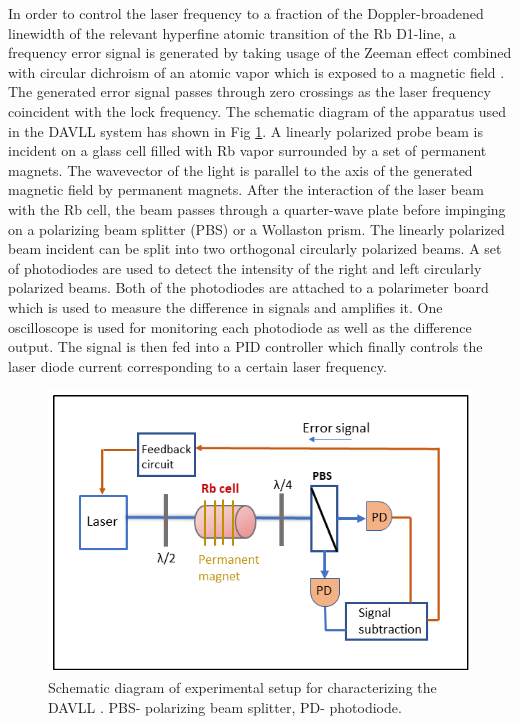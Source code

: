 In order to control the laser frequency to a fraction of the Doppler-broadened linewidth of the relevant hyperfine atomic transition of the Rb D1-line, a frequency error signal is generated by taking usage of the Zeeman effect combined with circular dichroism of an atomic vapor which is exposed to a magnetic field \cite{doi:10.1063/1.3568824}. The generated error signal passes through zero crossings as the laser frequency coincident with the lock frequency. The schematic diagram of the apparatus used in  the DAVLL system has shown in Fig \ref{fig:DAVLL}. A linearly polarized probe beam is incident on a glass cell filled with Rb vapor surrounded by a set of permanent magnets. The wavevector of the light is parallel to the axis of the generated magnetic field by permanent magnets. After the interaction of the laser beam with the Rb cell, the beam passes through a quarter-wave plate before impinging on a polarizing beam splitter (PBS) or a Wollaston prism. The linearly polarized beam incident can be split into two orthogonal circularly polarized beams. A set of photodiodes are used to detect the intensity of the right and left circularly polarized beams. Both of the photodiodes are attached to a polarimeter board which is used to measure the difference in signals and amplifies it. One oscilloscope is used for monitoring each photodiode as well as the difference output. The signal is then fed into a PID controller which finally controls the laser diode current corresponding to a certain laser frequency.
\begin{figure}[h]
\centering
\includegraphics[width=0.8\linewidth]{figures/DAVLL}
\caption{Schematic diagram of experimental setup for characterizing the DAVLL . PBS- polarizing beam splitter, PD- photodiode.\label{fig:DAVLL}}
\end{figure}
